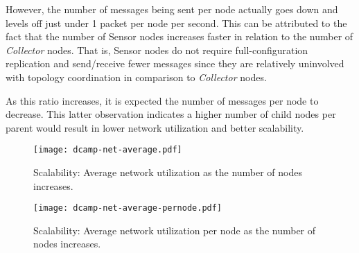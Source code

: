 However, the number of messages being sent per node actually goes down and levels off just under 1 packet per node per
second. This can be attributed to the fact that the number of Sensor nodes increases faster in relation to the number of
\textit{Collector} nodes. That is, Sensor nodes do not require full-configuration replication and send/receive fewer messages
since they are relatively uninvolved with topology coordination in comparison to \textit{Collector} nodes.

As this ratio increases, it is expected the number of messages per node to decrease. This latter observation indicates a
higher number of child nodes per parent would result in lower network utilization and better \dcamp scalability.

\begin{figure}[H]
    \centering
    \vspace{-20pt}
    \texttt{[image: dcamp-net-average.pdf]}
    \vspace{-40pt}
    \caption[Scalability: Average Network Utilization]
            {Scalability: Average network utilization as the number of \dcamp nodes increases.}
    \label{fig:net_avg_graph}
\end{figure}

\begin{figure}[H]
    \centering
    \vspace{-20pt}
    \texttt{[image: dcamp-net-average-pernode.pdf]}
    \vspace{-40pt}
    \caption[Scalability: Average Network Utilization Per Node]
            {Scalability: Average network utilization per node as the number of \dcamp nodes increases.}
    \label{fig:net_avg_pernode_graph}
\end{figure}
